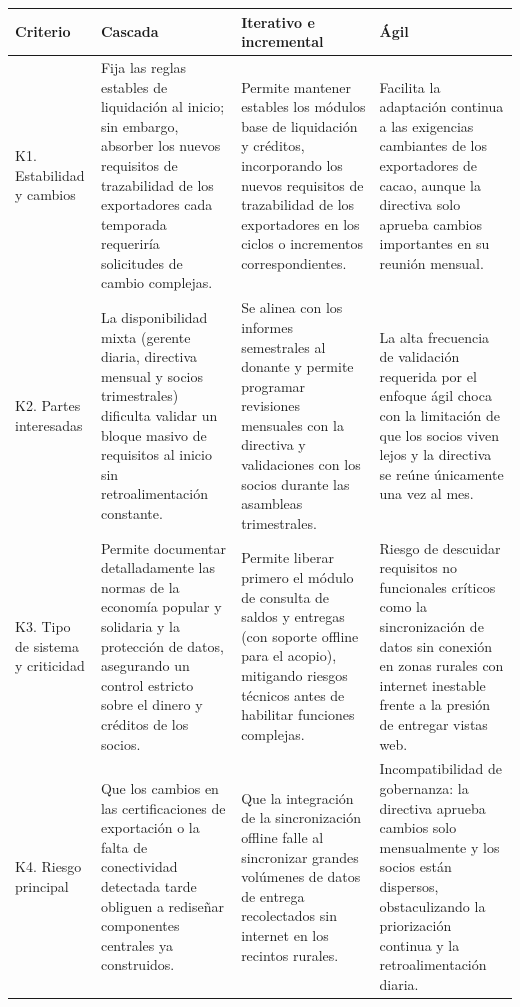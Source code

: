 \documentclass[11pt,a4paper]{article}
\begin{document}
\begingroup
\small
\setlength{\tabcolsep}{4pt}
\begin{xltabular}{\textwidth}{|p{0.17\textwidth}|X|X|X|}
\hline
{}
\textbf{Criterio} & \textbf{Cascada} &
\textbf{Iterativo e incremental} & \textbf{Ágil} \\ \hline
\endhead

K1. Estabilidad y cambios &
Fija las reglas estables de liquidación al inicio; sin embargo, absorber los nuevos requisitos de trazabilidad de los exportadores cada temporada requeriría solicitudes de cambio complejas. &
Permite mantener estables los módulos base de liquidación y créditos, incorporando los nuevos requisitos de trazabilidad de los exportadores en los ciclos o incrementos correspondientes. &
Facilita la adaptación continua a las exigencias cambiantes de los exportadores de cacao, aunque la directiva solo aprueba cambios importantes en su reunión mensual.
\\ \hline

K2. Partes interesadas &
La disponibilidad mixta (gerente diaria, directiva mensual y socios trimestrales) dificulta validar un bloque masivo de requisitos al inicio sin retroalimentación constante. &
Se alinea con los informes semestrales al donante y permite programar revisiones mensuales con la directiva y validaciones con los socios durante las asambleas trimestrales. &
La alta frecuencia de validación requerida por el enfoque ágil choca con la limitación de que los socios viven lejos y la directiva se reúne únicamente una vez al mes.
\\ \hline

K3. Tipo de sistema y criticidad &
Permite documentar detalladamente las normas de la economía popular y solidaria y la protección de datos, asegurando un control estricto sobre el dinero y créditos de los socios. &
Permite liberar primero el módulo de consulta de saldos y entregas (con soporte offline para el acopio), mitigando riesgos técnicos antes de habilitar funciones complejas. &
Riesgo de descuidar requisitos no funcionales críticos como la sincronización de datos sin conexión en zonas rurales con internet inestable frente a la presión de entregar vistas web.
\\ \hline

K4. Riesgo principal &
Que los cambios en las certificaciones de exportación o la falta de conectividad detectada tarde obliguen a rediseñar componentes centrales ya construidos. &
Que la integración de la sincronización offline falle al sincronizar grandes volúmenes de datos de entrega recolectados sin internet en los recintos rurales. &
Incompatibilidad de gobernanza: la directiva aprueba cambios solo mensualmente y los socios están dispersos, obstaculizando la priorización continua y la retroalimentación diaria.
\\ \hline


\end{xltabular}
\end{document}
